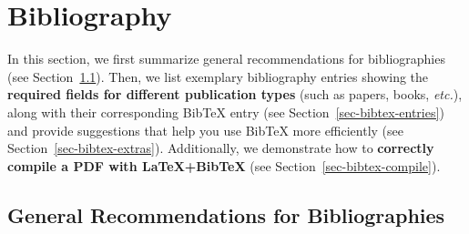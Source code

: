\documentclass[11pt,a4paper]{article}
\begin{document}
\newpage
\section{Bibliography}
\label{sec-bibtex}

In this section, we first summarize general recommendations for bibliographies (see Section~\ref{sec-bibtex-general}).
Then, we list exemplary bibliography entries showing the \textbf{required fields for different publication types} (such as papers, books, \emph{etc.}), along with their corresponding BibTeX entry (see Section~\ref{sec-bibtex-entries}) and provide suggestions that help you use BibTeX more efficiently (see Section~\ref{sec-bibtex-extras}).
Additionally, we demonstrate how to \textbf{correctly compile a PDF with \LaTeX+BibTeX} (see Section~\ref{sec-bibtex-compile}).


\subsection{General Recommendations for Bibliographies}
\label{sec-bibtex-general}
\end{document}
